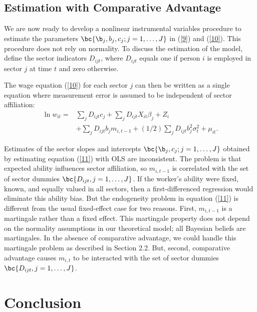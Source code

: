 \documentclass[12pt]{article}
\newcommand{\highlightR}[1]{{\emph{\color{MyRed}{#1}}}}
\theoremstyle{definition}
\begin{document}
\subsection{Estimation with Comparative Advantage}

We are now ready to develop a nonlinear instrumental variables procedure to estimate the parameters $\bc{\b_j, b_j, c_j; j = 1, \ldots, J}$ in (\ref{9}) and (\ref{10}). This procedure does not rely on normality. To discuss the estimation of the model, define the sector indicators $D_{ijt}$, where $D_{ijt}$ equals one if person $i$ is employed in sector $j$ at time $t$ and zero otherwise. 

The wage equation (\ref{10}) for each sector $j$ can then be written as a single equation where measurement error is assumed to be independent of sector affiliation:
\begin{equation}
    \label{11}
    \begin{aligned}
    \ln w_{i t}= & \sum_j D_{i j t} c_j+\sum_j D_{i j t} X_{i t} \beta_j+Z_i \\
    & +\sum_j D_{i j t} b_j m_{i, t-1}+(1 / 2) \sum_j D_{i j t} b_j^2 \sigma_t^2+\mu_{i t} .
    \end{aligned}
\end{equation}

Estimates of the sector slopes and intercepts $\bc{\b_j, c_j; j = 1, \ldots, J}$ obtained by estimating equation (\ref{11}) with OLS are inconsistent. The problem is that expected ability influences sector affiliation, so $m_{i, t-1}$ is correlated with the set of sector dummies $\bc{D_{ijt}, j = 1, \ldots, J}$. If the worker's ability were fixed, known, and equally valued in all sectors, then a first-differenced regression would eliminate this ability bias. But the endogeneity problem in equation (\ref{11}) is different from the usual fixed-effect case for two reasons. First, $m_{i,t-1}$ is a martingale rather than a fixed effect. This martingale property does not depend on the normality assumptions in our theoretical model; all Bayesian beliefs are martingales. In the absence of comparative advantage, we could handle this martingale problem as described in Section 2.2. But, second, comparative advantage causes $m_{i,t}$ to be interacted with the set of sector dummies $\bc{D_{ijt}, j = 1, \ldots, J}$.

\highlightR{SKIPPED FOR NOW!}


\section{Conclusion}
\end{document}
